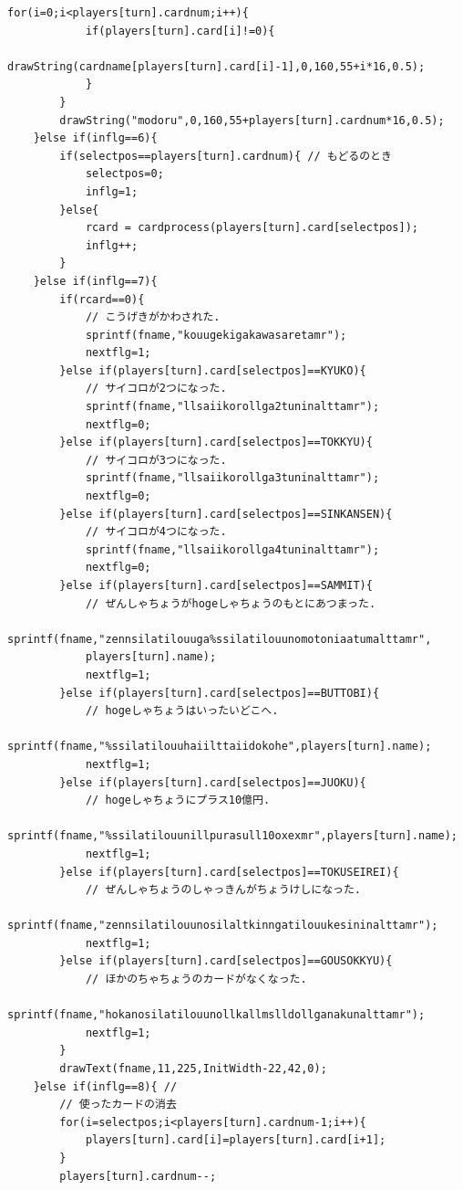 \documentclass[a4j]{jarticle}
\begin{document}
\begin{lstlisting}[basicstyle=\ttfamily\footnotesize, frame=single,label=code2,caption=game.c]
        for(i=0;i<players[turn].cardnum;i++){
            if(players[turn].card[i]!=0){
                drawString(cardname[players[turn].card[i]-1],0,160,55+i*16,0.5);                   
            }
        }
        drawString("modoru",0,160,55+players[turn].cardnum*16,0.5);
    }else if(inflg==6){
        if(selectpos==players[turn].cardnum){ // もどるのとき
            selectpos=0;
            inflg=1;
        }else{
            rcard = cardprocess(players[turn].card[selectpos]);
            inflg++;
        }
    }else if(inflg==7){
        if(rcard==0){
            // こうげきがかわされた.
            sprintf(fname,"kouugekigakawasaretamr");
            nextflg=1;
        }else if(players[turn].card[selectpos]==KYUKO){
            // サイコロが2つになった.
            sprintf(fname,"llsaiikorollga2tuninalttamr");
            nextflg=0;
        }else if(players[turn].card[selectpos]==TOKKYU){
            // サイコロが3つになった.
            sprintf(fname,"llsaiikorollga3tuninalttamr");
            nextflg=0;
        }else if(players[turn].card[selectpos]==SINKANSEN){
            // サイコロが4つになった.
            sprintf(fname,"llsaiikorollga4tuninalttamr");
            nextflg=0;
        }else if(players[turn].card[selectpos]==SAMMIT){
            // ぜんしゃちょうがhogeしゃちょうのもとにあつまった.
            sprintf(fname,"zennsilatilouuga%ssilatilouunomotoniaatumalttamr",
            players[turn].name);
            nextflg=1;
        }else if(players[turn].card[selectpos]==BUTTOBI){
            // hogeしゃちょうはいったいどこへ.
            sprintf(fname,"%ssilatilouuhaiilttaiidokohe",players[turn].name);
            nextflg=1;
        }else if(players[turn].card[selectpos]==JUOKU){
            // hogeしゃちょうにプラス10億円.
            sprintf(fname,"%ssilatilouunillpurasull10oxexmr",players[turn].name);
            nextflg=1;
        }else if(players[turn].card[selectpos]==TOKUSEIREI){
            // ぜんしゃちょうのしゃっきんがちょうけしになった.
            sprintf(fname,"zennsilatilouunosilaltkinngatilouukesininalttamr");
            nextflg=1;
        }else if(players[turn].card[selectpos]==GOUSOKKYU){
            // ほかのちゃちょうのカードがなくなった.
            sprintf(fname,"hokanosilatilouunollkallmslldollganakunalttamr");
            nextflg=1;
        }
        drawText(fname,11,225,InitWidth-22,42,0);      
    }else if(inflg==8){ // 
        // 使ったカードの消去
        for(i=selectpos;i<players[turn].cardnum-1;i++){
            players[turn].card[i]=players[turn].card[i+1];
        }
        players[turn].cardnum--;

\end{lstlisting}
\end{document}
